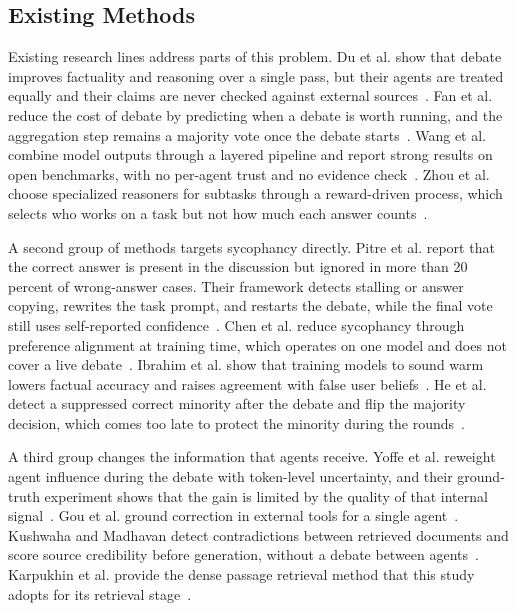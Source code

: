 \documentclass[a4paper,fleqn]{cas-sc}
\begin{document}
\subsection{Existing Methods}
Existing research lines address parts of this problem. Du et al. show that debate improves factuality and reasoning over a single pass, but their agents are treated equally and their claims are never checked against external sources~\cite{du2024improving}. Fan et al. reduce the cost of debate by predicting when a debate is worth running, and the aggregation step remains a majority vote once the debate starts~\cite{fan2026imad}. Wang et al. combine model outputs through a layered pipeline and report strong results on open benchmarks, with no per-agent trust and no evidence check~\cite{wang2025mixture}. Zhou et al. choose specialized reasoners for subtasks through a reward-driven process, which selects who works on a task but not how much each answer counts~\cite{zhou2025reso}.

A second group of methods targets sycophancy directly. Pitre et al. report that the correct answer is present in the discussion but ignored in more than 20 percent of wrong-answer cases. Their framework detects stalling or answer copying, rewrites the task prompt, and restarts the debate, while the final vote still uses self-reported confidence~\cite{pitre-etal-2025-consensagent}. Chen et al. reduce sycophancy through preference alignment at training time, which operates on one model and does not cover a live debate~\cite{chen2025self}. Ibrahim et al. show that training models to sound warm lowers factual accuracy and raises agreement with false user beliefs~\cite{ibrahim2026training}. He et al. detect a suppressed correct minority after the debate and flip the majority decision, which comes too late to protect the minority during the rounds~\cite{he2026minority}.

A third group changes the information that agents receive. Yoffe et al. reweight agent influence during the debate with token-level uncertainty, and their ground-truth experiment shows that the gain is limited by the quality of that internal signal~\cite{yoffe-etal-2025-debunc}. Gou et al. ground correction in external tools for a single agent~\cite{gou2024critic}. Kushwaha and Madhavan detect contradictions between retrieved documents and score source credibility before generation, without a debate between agents~\cite{kushwaha2026agentbased}. Karpukhin et al. provide the dense passage retrieval method that this study adopts for its retrieval stage~\cite{karpukhin2020dense}.
\end{document}
